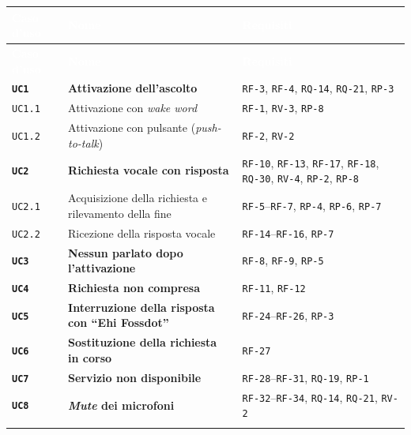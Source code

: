 \documentclass[12pt,a4paper]{article}
\newcommand{\thc}[1]{\textcolor{white}{\textbf{#1}}}
\newcommand{\rl}{\\ \arrayrulecolor{bfline}\hline}
\begin{document}
\begin{longtable}{>{\raggedright\arraybackslash}p{}>{\raggedright\arraybackslash}p{}>{\raggedright\arraybackslash}p{}}
\rowcolor{bfblue}\thc{Caso d'uso} & \thc{Nome} & \thc{Requisiti} \\
\endfirsthead
\rowcolor{bfblue}\thc{Caso d'uso} & \thc{Nome} & \thc{Requisiti} \\
\endhead
\textbf{\texttt{UC1}} & \textbf{Attivazione dell'ascolto} & \texttt{RF-3}, \texttt{RF-4}, \texttt{RQ-14}, \texttt{RQ-21}, \texttt{RP-3} \rl

\hspace{1em}\texttt{UC1.1} & Attivazione con \emph{wake word} & \texttt{RF-1}, \texttt{RV-3}, \texttt{RP-8} \rl

\hspace{1em}\texttt{UC1.2} & Attivazione con pulsante (\emph{push-to-talk}) & \texttt{RF-2}, \texttt{RV-2} \rl

\textbf{\texttt{UC2}} & \textbf{Richiesta vocale con risposta} & \texttt{RF-10}, \texttt{RF-13}, \texttt{RF-17}, \texttt{RF-18}, \texttt{RQ-30}, \texttt{RV-4}, \texttt{RP-2}, \texttt{RP-8} \rl

\hspace{1em}\texttt{UC2.1} & Acquisizione della richiesta e rilevamento della fine & \texttt{RF-5}--\texttt{RF-7}, \texttt{RP-4}, \texttt{RP-6}, \texttt{RP-7} \rl

\hspace{1em}\texttt{UC2.2} & Ricezione della risposta vocale & \texttt{RF-14}--\texttt{RF-16}, \texttt{RP-7} \rl

\textbf{\texttt{UC3}} & \textbf{Nessun parlato dopo l'attivazione} & \texttt{RF-8}, \texttt{RF-9}, \texttt{RP-5} \rl

\textbf{\texttt{UC4}} & \textbf{Richiesta non compresa} & \texttt{RF-11}, \texttt{RF-12} \rl

\textbf{\texttt{UC5}} & \textbf{Interruzione della risposta con ``Ehi Fossdot''} & \texttt{RF-24}--\texttt{RF-26}, \texttt{RP-3} \rl

\textbf{\texttt{UC6}} & \textbf{Sostituzione della richiesta in corso} & \texttt{RF-27} \rl

\textbf{\texttt{UC7}} & \textbf{Servizio non disponibile} & \texttt{RF-28}--\texttt{RF-31}, \texttt{RQ-19}, \texttt{RP-1} \rl

\textbf{\texttt{UC8}} & \textbf{\emph{Mute} dei microfoni} & \texttt{RF-32}--\texttt{RF-34}, \texttt{RQ-14}, \texttt{RQ-21}, \texttt{RV-2} \rl


\end{longtable}
\end{document}
